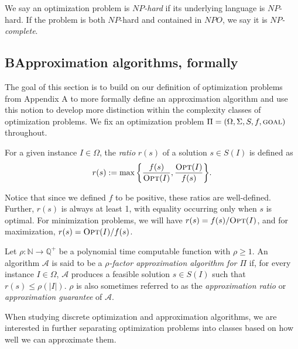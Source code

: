 \documentclass{article}
\newcommand{\N}{\mathbb{N}}
\newcommand{\Q}{\mathbb{Q}}
\newenvironment{definition}[2][Definition]{\begin{trivlist}
\item[\hskip \labelsep {\bfseries #1}\hskip \labelsep {\hspace{-1ex}\bfseries #2.}]}{\end{trivlist}}
\begin{document}
\begin{definition}{}{}
    We say an optimization problem is $NP$\textit{-hard} if its underlying language is $NP$-hard. If the problem is both $NP$-hard and contained in $NPO$, we say it is $NP$\textit{-complete}.
\end{definition}

\subsection*{B\hspace{12pt}Approximation algorithms, formally}

The goal of this section is to build on our definition of optimization problems from Appendix A to more formally define an approximation algorithm and use this notion to develop more distinction within the complexity classes of optimization problems. We fix an optimization problem $\Pi = (\Omega, \Sigma, S, f, \textsc{goal})$ throughout.

\begin{definition}{ (Approximation Ratio)}{}
    For a given instance $I \in \Omega$, the \textit{ratio} $r(s)$ of a solution $s \in S(I)$ is defined as
    \[
    r(s) := \max \bigg\{ \frac{f(s)}{\textsc{Opt}(I)}, \frac{\textsc{Opt}(I)}{f(s)} \bigg\}.
    \]
\end{definition}

\noindent Notice that since we defined $f$ to be positive, these ratios are well-defined. Further, $r(s)$ is always at least 1, with equality occurring only when $s$ is optimal. For minimization problems, we will have $r(s) = f(s)/\textsc{Opt}(I)$, and for maximization, $r(s) = \textsc{Opt}(I)/f(s)$.

\begin{definition}{ (Approximation Algorithm)}{}
    Let $\rho : \N \to \Q^+$ be a polynomial time computable function with $\rho \geq 1$. An algorithm $\mathcal{A}$ is said to be a \textit{$\rho$-factor approximation algorithm for $\Pi$} if, for every instance $I \in \Omega$, $\mathcal{A}$ produces a feasible solution $s \in S(I)$ such that $r(s) \leq \rho(|I|)$. $\rho$ is also sometimes referred to as the \textit{approximation ratio} or \textit{approximation guarantee} of $\mathcal{A}$.
\end{definition}

\noindent When studying discrete optimization and approximation algorithms, we are interested in further separating optimization problems into classes based on how well we can approximate them.
\end{document}
